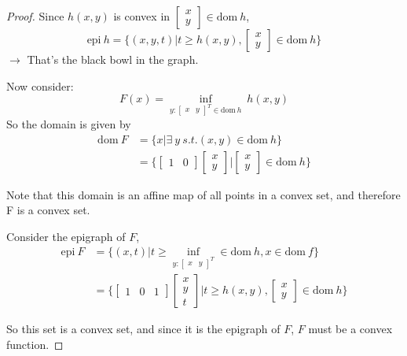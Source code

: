 \begin{proof}
	Since $h(x,y)$ is convex in 
	$\begin{bmatrix}
	x\\
	y
	\end{bmatrix}
	\in \text{dom}\ h$,
	\begin{equation*}
	\text{epi}\ h = \{(x,y,t)|t\geq h(x,y), \begin{bmatrix}
	x\\
	y
	\end{bmatrix}\in \text{dom}\ h \}
	\end{equation*}
	$\rightarrow$ That's the black bowl in the graph. 
	
	Now consider:
	\begin{equation*}
	F(x) = \inf_{y:
		\begin{bmatrix}
		x&y
		\end{bmatrix}^T
		\in \text{dom}\ h}
	\ h(x,y)
	\end{equation*}
	So the domain is given by
	\begin{align*}
	\text{dom}\ F &= \{x|\exists\ y\ s.t. (x,y)\in \text{dom}\ h \}\\
	&= \{\begin{bmatrix}
	1&0
	\end{bmatrix}
	\begin{bmatrix}
	x\\
	y
	\end{bmatrix} 
	\vert
	\begin{bmatrix}
	x\\
	y
	\end{bmatrix}\in \text{dom}\ h \}
	\end{align*}
	
	Note that this domain is an affine map of all points in a convex set, and therefore  F is a convex set.
	
	Consider the epigraph of $F$,
\begin{align*}
\text{epi}\ F 
&= \{(x,t)|t\geq \inf_{y:
	\begin{bmatrix}
	x&y
	\end{bmatrix}^T
}
\in \text{dom}\ h, x\in \text{dom}\ f \}\\
&= \{
\begin{bmatrix}
1&0&1
\end{bmatrix}
\begin{bmatrix}
x\\
y\\
t
\end{bmatrix}
\vert t\geq h(x,y), 
\begin{bmatrix}
x\\
y
\end{bmatrix}\in \text{dom}\ h \}
\end{align*}

So this set is a convex set, and since it is the epigraph of $F$, $F$ must be a convex function. 

\end{proof}


